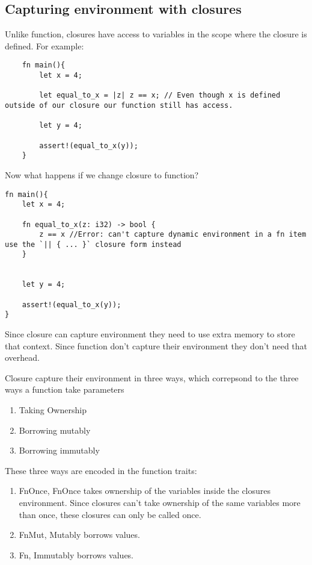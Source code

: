 \subsection{Capturing environment with closures}

Unlike function, closures have access to variables in the scope where the closure is defined. For example:\begin{lstlisting}
    fn main(){
        let x = 4;

        let equal_to_x = |z| z == x; // Even though x is defined outside of our closure our function still has access.

        let y = 4;

        assert!(equal_to_x(y));
    }
\end{lstlisting}

Now what happens if we change closure to function?

\begin{lstlisting}
fn main(){
    let x = 4;

    fn equal_to_x(z: i32) -> bool {
        z == x //Error: can't capture dynamic environment in a fn item use the `|| { ... }` closure form instead
    }


    let y = 4;

    assert!(equal_to_x(y));
}
\end{lstlisting}

Since closure can capture environment they need to use extra memory to store that context. Since function don't capture their environment they don't need that overhead.

Closure capture their environment in three ways, which correpsond to the three ways a function take parameters\begin{enumerate}
    \item Taking Ownership
    \item Borrowing mutably
    \item Borrowing immutably 
\end{enumerate}

These three ways are encoded in the function traits: \begin{enumerate}
    \item FnOnce, FnOnce takes ownership of the variables inside the closures environment. Since closures can't take ownership of the same variables more than once, these closures can only be called once.
    \item FnMut, Mutably borrows values.
    \item Fn, Immutably borrows values.
\end{enumerate}

